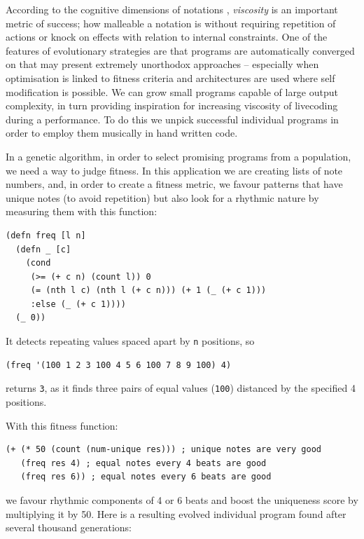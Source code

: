 \documentclass[letterpaper, 12pt]{article}
\begin{document}


According to the cognitive dimensions of notations \citep{green1989cognitive}, \emph{viscosity} is an important metric of success; how malleable a notation is without requiring repetition of actions or knock on effects with relation to internal constraints. One of the features of evolutionary strategies are that programs are automatically converged on that may present extremely unorthodox approaches -- especially when optimisation is linked to fitness criteria and architectures are used where self modification is possible. We can grow small programs capable of large output complexity, in turn providing inspiration for increasing viscosity of livecoding during a performance. To do this we unpick successful individual programs in order to employ them musically in hand written code.

In a genetic algorithm, in order to select promising programs from a population, we need a way to judge fitness. In this application we are creating lists of note numbers, and, in order to create a fitness metric, we favour patterns that have unique notes (to avoid repetition) but also look for a rhythmic nature by measuring them with this function:

\begin{Verbatim}[fontfamily=courier, xleftmargin=\parindent]
(defn freq [l n]
  (defn _ [c]
    (cond
     (>= (+ c n) (count l)) 0
     (= (nth l c) (nth l (+ c n))) (+ 1 (_ (+ c 1)))
     :else (_ (+ c 1))))
  (_ 0))
\end{Verbatim}

It detects repeating values spaced apart by \texttt{n} positions, so
\begin{Verbatim}[fontfamily=courier, xleftmargin=\parindent]
(freq '(100 1 2 3 100 4 5 6 100 7 8 9 100) 4)
\end{Verbatim}
returns \texttt{3}, as it finds three pairs of equal values (\texttt{100}) distanced by the specified 4 positions.

With this fitness function:
\begin{Verbatim}[fontfamily=courier, xleftmargin=\parindent]
(+ (* 50 (count (num-unique res))) ; unique notes are very good
   (freq res 4) ; equal notes every 4 beats are good
   (freq res 6)) ; equal notes every 6 beats are good
\end{Verbatim}
we favour rhythmic components of 4 or 6 beats and boost the uniqueness score by multiplying it by 50. Here is a resulting evolved individual program found after several thousand generations:
\end{document}
